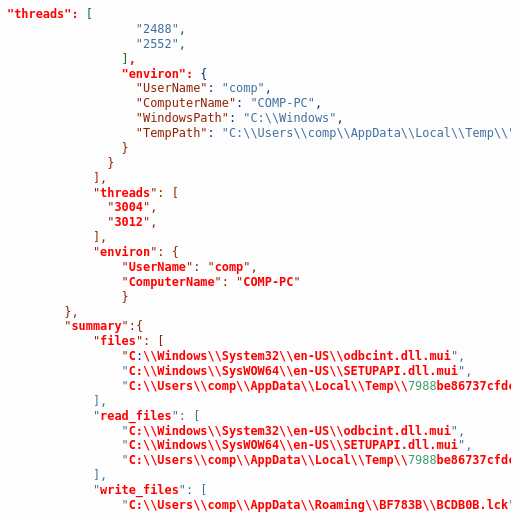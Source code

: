 \begin{lstlisting}[language=json, caption={Example of \emph{behavior} part entries in \emph{report.json} - only examples of entries},captionpos=b, label={lst:report_example}]
                "threads": [
                  "2488",
                  "2552",
                ],
                "environ": {
                  "UserName": "comp",
                  "ComputerName": "COMP-PC",
                  "WindowsPath": "C:\\Windows",
                  "TempPath": "C:\\Users\\comp\\AppData\\Local\\Temp\\","
                }
              }
            ],
            "threads": [
              "3004",
              "3012",
            ],
            "environ": {
                "UserName": "comp",
                "ComputerName": "COMP-PC"
                }          
        },
        "summary":{
            "files": [
                "C:\\Windows\\System32\\en-US\\odbcint.dll.mui",
                "C:\\Windows\\SysWOW64\\en-US\\SETUPAPI.dll.mui",
                "C:\\Users\\comp\\AppData\\Local\\Temp\\7988be86737cfdcc6f6a.exe"
            ],
            "read_files": [
                "C:\\Windows\\System32\\en-US\\odbcint.dll.mui",
                "C:\\Windows\\SysWOW64\\en-US\\SETUPAPI.dll.mui",
                "C:\\Users\\comp\\AppData\\Local\\Temp\\7988be86737cfdcc6f6a.exe"
            ],
            "write_files": [
                "C:\\Users\\comp\\AppData\\Roaming\\BF783B\\BCDB0B.lck",

\end{lstlisting}
